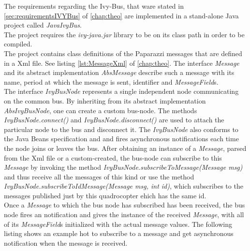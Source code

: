 The requirements regarding the Ivy-Bus, that ware stated in \ref{sec:requirementsIVYBus} of \ref{chap:theo} are implemented in a stand-alone Java project called \textit{JavaIvyBus}. \\
The project requires the \textit{ivy-java.jar} library to be on its class path in order to be compiled.\\
The project contains class definitions of the Paparazzi messages that are defined in a Xml file. See listing \ref{lst:MessageXml} of \ref{chap:theo}. The interface \textit{Message} and its abstract implementation \textit{AbsMessage} describe such a message with its name, period at which the message is sent, identifier and \textit{MessageField}s. \\
The interface \textit{IvyBusNode} represents a single independent node communicating on the common bus. By inheriting from its abstract implementation \textit{AbsIvyBusNode}, one can create a custom bus-node. The methods \textit{IvyBusNode.connect()} and \textit{IvyBusNode.disconnect()} are used to attach the particular node to the bus and disconnect it. The \textit{IvyBusNode} also conforms to the Java Beans specification and and fires asynchronous notifications each time the node joins or leaves the bus.
After obtaining an instance of a \textit{Message}, parsed from the Xml file or a custom-created, the bus-node can subscribe to this \textit{Message} by invoking the method \textit{IvyBusNode.subscribeToMessage(Message msg)} and thus receive all the messages of this kind or use the method \textit{IvyBusNode.subscribeToIdMessage(Message msg, int id)}, which subscribes to the messages published just by this quadrocopter ehich has the same id. \\
Once a \textit{Message} to which the bus node has subscribed has been received, the bus node fires an notification and gives the instance of the received \textit{Message}, with all of its \textit{MessageField}s initialized with the actual message values. The following listing shows an example hot to subscribe to a message and get asynchronous notification when the message is received.

